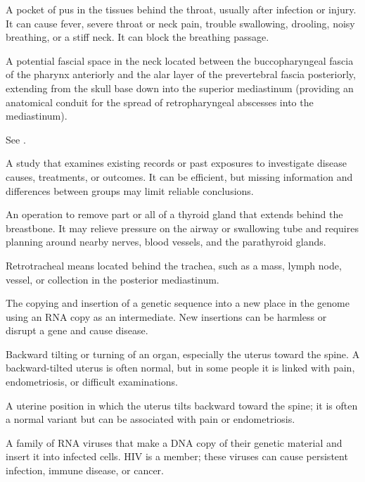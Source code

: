  A pocket of pus in the tissues behind the throat, usually after infection or injury. It can cause fever, severe throat or neck pain, trouble swallowing, drooling, noisy breathing, or a stiff neck. It can block the breathing passage.

 A potential fascial space in the neck located between the buccopharyngeal fascia of the pharynx anteriorly and the alar layer of the prevertebral fascia posteriorly, extending from the skull base down into the superior mediastinum (providing an anatomical conduit for the spread of retropharyngeal abscesses into the mediastinum).

 See .

 A study that examines existing records or past exposures to investigate disease causes, treatments, or outcomes. It can be efficient, but missing information and differences between groups may limit reliable conclusions.

 An operation to remove part or all of a thyroid gland that extends behind the breastbone. It may relieve pressure on the airway or swallowing tube and requires planning around nearby nerves, blood vessels, and the parathyroid glands.

 Retrotracheal means located behind the trachea, such as a mass, lymph node, vessel, or collection in the posterior mediastinum.

 The copying and insertion of a genetic sequence into a new place in the genome using an RNA copy as an intermediate. New insertions can be harmless or disrupt a gene and cause disease.

 Backward tilting or turning of an organ, especially the uterus toward the spine. A backward-tilted uterus is often normal, but in some people it is linked with pain, endometriosis, or difficult examinations.

 A uterine position in which the uterus tilts backward toward the spine; it is often a normal variant but can be associated with pain or endometriosis.

 A family of RNA viruses that make a DNA copy of their genetic material and insert it into infected cells. HIV is a member; these viruses can cause persistent infection, immune disease, or cancer.

